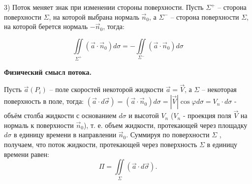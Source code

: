   
3) Поток меняет знак при изменении стороны поверхности. Пусть $\Sigma^+$ – сторона поверхности $\Sigma$, на которой выбрана нормаль $\vec{n}_0$, а $\Sigma^-$ – сторона поверхности $\Sigma$, на которой берется нормаль $-\vec{n}_0$, тогда:

$$\iint\limits_{\Sigma^+}(\vec{a}\cdot
\vec{n}_0) d\sigma = -\iint\limits_{\Sigma^-}(\vec{a}\cdot
\vec{n}_0) d\sigma $$


\begin{center}
	\textbf{Физический смысл потока.}
\end{center}

Пусть $\vec{a}(P_i)$ – поле скоростей некоторой жидкости $\vec{a} = \vec{V}$, а  $\Sigma$ – некоторая поверхность в поле, тогда: $(\vec{a}\cdot d\vec{\sigma}) = (\vec{a}\cdot \vec{n}_0) d\sigma = |\vec{V}|\cos\varphi d\sigma = V_n \cdot d\sigma$ - объём столба жидкости с основанием $d\sigma$ и высотой $V_n$ ($V_n$ - проекция поля $\vec{V}$ на нормаль к поверхности $\vec{n}_0$), т. е. объем
жидкости, протекающей через площадку $d\sigma$ в единицу времени в направлении $\vec{n}_0$. Суммируя по поверхности $\Sigma$ , получаем, что поток жидкости, протекающей через поверхность $\Sigma$ в единицу времени равен:
$$\Pi=\iint\limits_\Sigma(\vec{a} \cdot d \vec{\sigma}).$$

